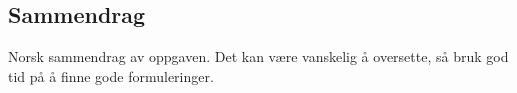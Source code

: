 \begin{otherlanguage}{norsk}
\section*{Sammendrag} %


Norsk sammendrag av oppgaven. Det kan være vanskelig å oversette, så bruk god tid på å finne gode formuleringer.
\end{otherlanguage}

\cleardoublepage